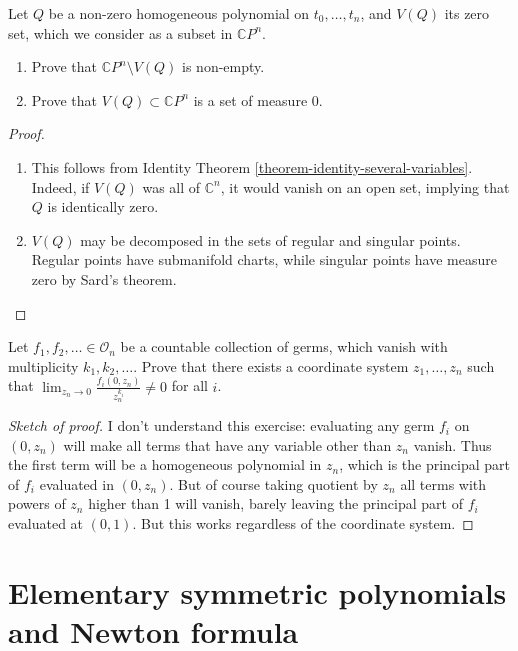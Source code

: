 \begin{exercise}
\label{exercise-zero-locus-of-homogeneous-polynomial}
Let $Q$ be a non-zero homogeneous polynomial on $t_0,\ldots,t_n$, and $V(Q)$ its
zero set, which we consider as a subset in $\mathbb{C}P^{n}$.
\begin{enumerate}
\item Prove that $\mathbb{C}P^{n}\setminus V(Q)$ is non-empty.
\item Prove that $V(Q)\subset\mathbb{C}P^{n}$ is a set of measure 0.
\end{enumerate}
\end{exercise}

\begin{proof}
\begin{enumerate}
\item This follows from Identity Theorem
\ref{theorem-identity-several-variables}. Indeed, if $V(Q)$ was all of
$\mathbb{C}^{n}$, it would vanish on an open set, implying that $Q$ is
identically zero.
\item $V(Q)$ may be decomposed in the sets of regular and singular points.
Regular points have submanifold charts, while singular points have measure zero
by Sard's theorem.
\end{enumerate}
\end{proof}

\begin{exercise}
\label{exercise-principal-parts}
Let $f_1,f_2,\ldots\in \mathcal{O}_n$ be a countable collection of germs, which
vanish with multiplicity $k_1,k_2,\ldots$. Prove that there exists a coordinate
system $z_1,\ldots,z_n$ such that 
$\lim_{z_n\to 0} \frac{f_i(0,z_n)}{z_n^{k_i}}\neq 0$ for all $i$.
\end{exercise}

\begin{proof}[Sketch of proof]
I don't understand this exercise: evaluating any germ $f_i$ on $(0,z_n)$ will
make all terms that have any variable other than $z_n$ vanish. Thus the first
term will be a homogeneous polynomial in $z_n$, which is the principal part of
$f_i$ evaluated in $(0,z_n)$. But of course taking quotient by $z_n$ all terms
with powers of $z_n$ higher than 1 will vanish, barely leaving the principal
part of $f_i$ evaluated at $(0,1)$. But this works regardless of the coordinate
system.
\end{proof}

\section{Elementary symmetric polynomials and Newton formula}
\label{section-elementary-symmetric-polynomials-and-Newton-formula}

